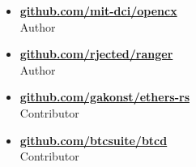 
\begin{itemize}
    \item \href{https://github.com/mit-dci/opencx}{\textbf{github.com/mit-dci/opencx}}
        \\ Author
    \item
        \href{https://github.com/rjected/ranger}{\textbf{github.com/rjected/ranger}}
        \\ Author
    \item
        \href{https://github.com/gakonst/ethers-rs}{\textbf{github.com/gakonst/ethers-rs}}
        \\ Contributor
    \item
        \href{https://github.com/btcsuite/btcd}{\textbf{github.com/btcsuite/btcd}}
        \\ Contributor
\end{itemize}
